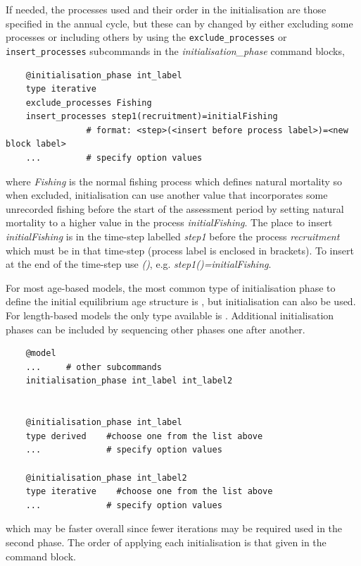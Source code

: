 If needed, the processes used and their order in the initialisation are those specified in the annual cycle, but these can by changed by either excluding some processes or including others by using the  \texttt{exclude\_processes} or  \texttt{insert\_processes} subcommands in the \textit{initialisation\_phase} command blocks,

{\small{\begin{verbatim}
	@initialisation_phase int_label
	type iterative
	exclude_processes Fishing
	insert_processes step1(recruitment)=initialFishing
	            # format: <step>(<insert before process label>)=<new block label>
	...         # specify option values
\end{verbatim}}}

where \textit{Fishing} is the normal fishing process which defines natural mortality so when excluded, initialisation can use another value that incorporates some unrecorded fishing before the start of the assessment period by setting natural mortality to a higher value in the process \textit{initialFishing}. The place to insert \textit{initialFishing} is in the time-step labelled \textit{step1} before the process \textit{recruitment} which must be in that time-step (process label is enclosed in brackets). To insert at the end of the time-step use \textit{()}, e.g. \textit{step1()=initialFishing}.

For most age-based models, the most common type of initialisation phase to define the initial equilibrium age structure is , but  initialisation can also be used. For length-based models the only type available is . Additional initialisation phases can be included by sequencing other phases one after another.

{\small{\begin{verbatim}
	@model
	...     # other subcommands
	initialisation_phase int_label int_label2
	
	
	@initialisation_phase int_label
	type derived    #choose one from the list above
	...             # specify option values
	
	@initialisation_phase int_label2
	type iterative    #choose one from the list above
	...             # specify option values
\end{verbatim}}}

which may be faster overall since fewer iterations may be required used in the second phase. The order of applying each initialisation is that given in the  command block.

